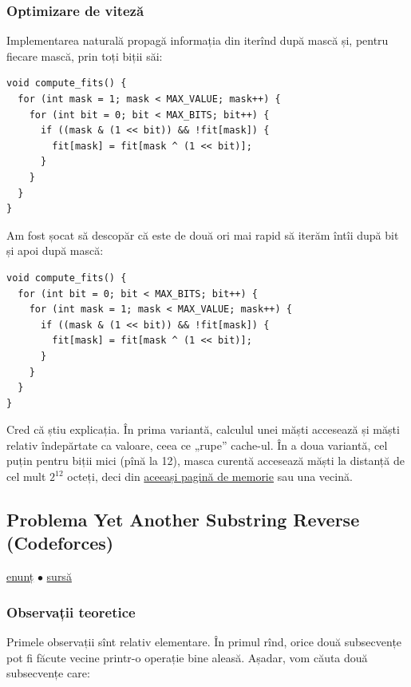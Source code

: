 \documentclass[../main.tex]{subfiles}
\begin{document}
\subsubsection*{Optimizare de viteză}

Implementarea naturală propagă informația din  iterînd după mască și, pentru fiecare mască, prin toți biții săi:

\begin{verbatim}
void compute_fits() {
  for (int mask = 1; mask < MAX_VALUE; mask++) {
    for (int bit = 0; bit < MAX_BITS; bit++) {
      if ((mask & (1 << bit)) && !fit[mask]) {
        fit[mask] = fit[mask ^ (1 << bit)];
      }
    }
  }
}
\end{verbatim}

Am fost șocat să descopăr că este de două ori mai rapid să iterăm întîi după bit și apoi după mască:

\begin{verbatim}
void compute_fits() {
  for (int bit = 0; bit < MAX_BITS; bit++) {
    for (int mask = 1; mask < MAX_VALUE; mask++) {
      if ((mask & (1 << bit)) && !fit[mask]) {
        fit[mask] = fit[mask ^ (1 << bit)];
      }
    }
  }
}
\end{verbatim}

Cred că știu explicația. În prima variantă, calculul unei măști accesează și măști relativ îndepărtate ca valoare, ceea ce „rupe” cache-ul. În a doua variantă, cel puțin pentru biții mici (pînă la 12), masca curentă accesează măști la distanță de cel mult $2^{12}$ octeți, deci din \href{https://unix.stackexchange.com/a/317940/276112}{aceeași pagină de memorie} sau una vecină.


\subsection{Problema Yet Another Substring Reverse (Codeforces)}
\label{problem:yet-another-substring-reverse}

\href{https://codeforces.com/contest/1234/problem/F}{enunț}
$\bullet$
\hyperref[code:yet-another-substring-reverse]{sursă}

\subsubsection*{Observații teoretice}

Primele observații sînt relativ elementare. În primul rînd, orice două subsecvențe pot fi făcute vecine printr-o operație bine aleasă. Așadar, vom căuta două subsecvențe care:
\end{document}
